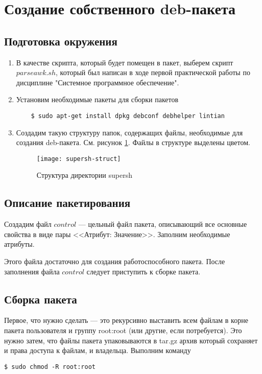\documentclass[a4paper,14pt]{extarticle}
\begin{document}
\section{Создание собственного deb-пакета}
\subsection{Подготовка окружения}
\begin{enumerate}
	\item В качестве скрипта, который будет помещен в пакет, выберем скрипт $parseawk.sh$, который был написан в ходе первой практической работы по дисциплине "Системное программное обеспечение".
	\item Установим необходимые пакеты для сборки пакетов
	\begin{lstlisting}
	$ sudo apt-get install dpkg debconf debhelper lintian
	\end{lstlisting}
	\item Создадим такую структуру папок, содержащих файлы, необходимые для создания deb-пакета. См. рисунок \ref{img:struct}. Файлы в структуре выделены цветом.
	\begin{figure}[h!]
		\centering
		\texttt{[image: supersh-struct]}
		\caption{Структура директории supersh}
		\label{img:struct}
		\end{figure}
\end{enumerate}
\subsection{Описание пакетирования}
Создадим файл $control$ --- цельный файл пакета, описывающий все основные свойства в виде пары <<Атрибут: Значение>>. Заполним необходимые атрибуты.


Этого файла достаточно для создания работоспособного пакета. После заполнения файла $control$ следует приступить к сборке пакета.
\subsection{Сборка пакета}
Первое, что нужно сделать --- это рекурсивно выставить всем файлам в корне пакета пользователя и
группу root:root (или другие, если потребуется). Это нужно затем, что файлы пакета упаковываются в
tar.gz архив который сохраняет и права доступа к файлам, и владельца. Выполним команду
\begin{lstlisting}
$ sudo chmod -R root:root
\end{lstlisting}
\end{document}
